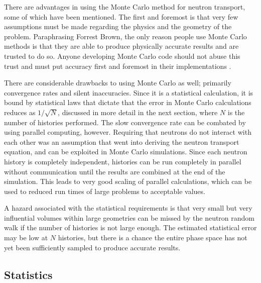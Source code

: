 There are advantages in using the Monte Carlo method for neutron transport, some of which have been mentioned.  The first and foremost is that very few assumptions must be made regarding the physics and the geometry of the problem. Paraphrasing Forrest Brown, the only reason people use Monte Carlo methods is that they are able to produce physically accurate results and are trusted to do so.  Anyone developing Monte Carlo code should not abuse this trust and must put accuracy first and foremost in their implementations \cite{fb_snamc}.

There are considerable drawbacks to using Monte Carlo as well; primarily convergence rates and silent inaccuracies.  Since it is a statistical calculation, it is bound by statistical laws that dictate that the error in Monte Carlo calculations reduces as $1/\sqrt{N}$, discussed in more detail in the next section, where $N$ is the number of histories performed.  The slow convergence rate can be combated by using parallel computing, however.  Requiring that neutrons do not interact with each other was an assumption that went into deriving the neutron transport equation, and can be exploited in Monte Carlo simulations.  Since each neutron history is completely independent, histories can be run completely in parallel without communication until the results are combined at the end of the simulation.  This leads to very good scaling of parallel calculations, which can be used to reduced run times of large problems to acceptable values.

A hazard associated with the statistical requirements is that very small but very influential volumes within large geometries can be missed by the neutron random walk if the number of histories is not large enough.  The estimated statistical error may be low at $N$ histories, but there is a chance the entire phase space has not yet been sufficiently sampled to produce accurate results.  

\subsection{Statistics}
\label{sec:stat}

